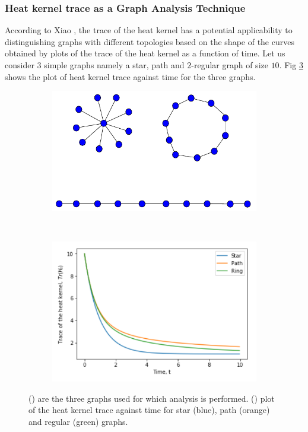 \documentclass[10pt,a4paper]{article}
\theoremstyle{plain}
\theoremstyle{definition}
\begin{document}
        \subsubsection{Heat kernel trace as a Graph Analysis Technique}
        According to Xiao \citep{xiao2009graph}, the trace of the heat kernel has a potential applicability to distinguishing graphs with different topologies based on the shape of the curves obtained by plots of the trace of the heat kernel as a function of time. Let us consider $3$ simple graphs namely a star, path and $2$-regular graph of size $10$. Fig \ref{distinguishGraphs} shows the plot of heat kernel trace against time for the three graphs.
        
        \begin{figure}[H]
        	\centering
        	\begin{subfigure}[b]{0.45\textwidth}
        		\includegraphics[width= \textwidth]{images/kernel-graphs.pdf}
        		\caption{}
        		\label{kernelgraphs}
        	\end{subfigure}~
        	\begin{subfigure}[b]{0.45\textwidth}
        		\includegraphics[width= \textwidth]{images/Trace-kernel-plot}
        		\caption{}
        		\label{plot-kernel}
        	\end{subfigure}
        	\caption{() are the three graphs used for which analysis is performed. () plot of the heat kernel trace against time for star (blue), path (orange) and regular (green) graphs.}
        	\label{distinguishGraphs}
        \end{figure}
\end{document}

